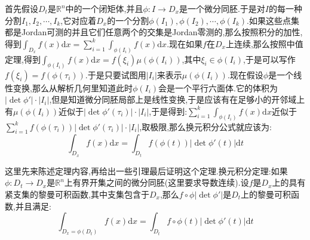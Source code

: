 首先假设$D_t$是$\mathbb{R}^n$中的一个闭矩体,并且$\phi:I\to D_x$是一个微分同胚.于是对$I$的每一种分割$I_1,I_2,\cdots,I_k$,它对应着$D_x$的一个分割$\phi(I_1),\phi(I_2),\cdots,\phi(I_k)$.如果这些点集都是Jordan可测的并且它们任意两个的交集是Jordan零测的,那么按照积分的加性,得到$\int_{D_x}f(x)\mathrm{d}x=\sum_{i=1}^{k}\int_{\phi(I_i)}f(x)\mathrm{d}x$.现在如果$f$在$D_x$上连续,那么按照中值定理,得到$\int_{\phi(I_i)}f(x)\mathrm{d}x=f(\xi_i)\mu(\phi(I_i))$,其中$\xi_i\in\phi(I_i)$,于是可以写作$f(\xi_i)=f(\phi(\tau_i))$.于是只要试图用$|I_i|$来表示$\mu(\phi(I_i))$.现在假设$\phi$是一个线性变换,那么从解析几何里知道此时$\phi(I_i)$会是一个平行六面体.它的体积为$|\det\phi'|\cdot|I_i|$,但是知道微分同胚局部上是线性变换,于是应该有在足够小的开邻域上有$\mu(\phi(I_i))$近似于$|\det\phi'(\tau_i)|\cdot|I_i|$,于是得到:$\sum_{i=1}^{k}\int_{\phi(I_i)}f(x)\mathrm{d}x$近似于$\sum_{i=1}^{k}f(\phi(\tau_i))|\det\phi'(\tau_i)|\cdot|I_i|$,取极限,那么换元积分公式就应该为:
$$\int_{D_x}f(x)\mathrm{d}x=\int_{D_t}f(\phi(t))|\det\phi'(t)|\mathrm{d}t$$

这里先来陈述定理内容,再给出一些引理最后证明这个定理.换元积分定理:如果$\phi:D_t\to D_x$是$\mathbb{R}^n$上有界开集之间的微分同胚(这里要求导数连续).设$f$是$D_x$上的具有紧支集的黎曼可积函数,其中支集包含于$D_x$,那么$f\circ\phi|\det\phi'|$是$D_t$上的黎曼可积函数,并且满足:
$$\int_{D_x=\phi(D_t)}f(x)\mathrm{d}x=\int_{D_t}f\circ\phi(t)|\det\phi'(t)|\mathrm{d}t$$

